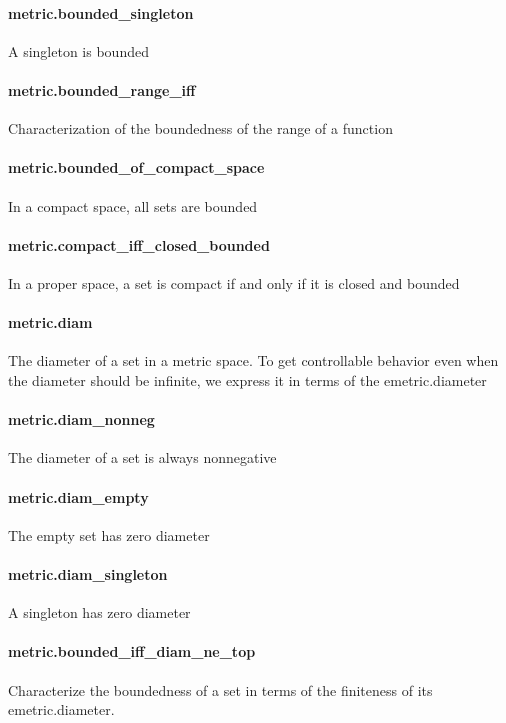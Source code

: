 \documentclass{article}
\begin{document}
\paragraph{metric.bounded\_singleton}
\par
A singleton is bounded
\paragraph{metric.bounded\_range\_iff}
\par
Characterization of the boundedness of the range of a function
\paragraph{metric.bounded\_of\_compact\_space}
\par
In a compact space, all sets are bounded
\paragraph{metric.compact\_iff\_closed\_bounded}
\par
In a proper space, a set is compact if and only if it is closed and bounded
\paragraph{metric.diam}
\par
The diameter of a set in a metric space. To get controllable behavior even when the diameter
should be infinite, we express it in terms of the emetric.diameter
\paragraph{metric.diam\_nonneg}
\par
The diameter of a set is always nonnegative
\paragraph{metric.diam\_empty}
\par
The empty set has zero diameter
\paragraph{metric.diam\_singleton}
\par
A singleton has zero diameter
\paragraph{metric.bounded\_iff\_diam\_ne\_top}
\par
Characterize the boundedness of a set in terms of the finiteness of its emetric.diameter.
\end{document}
